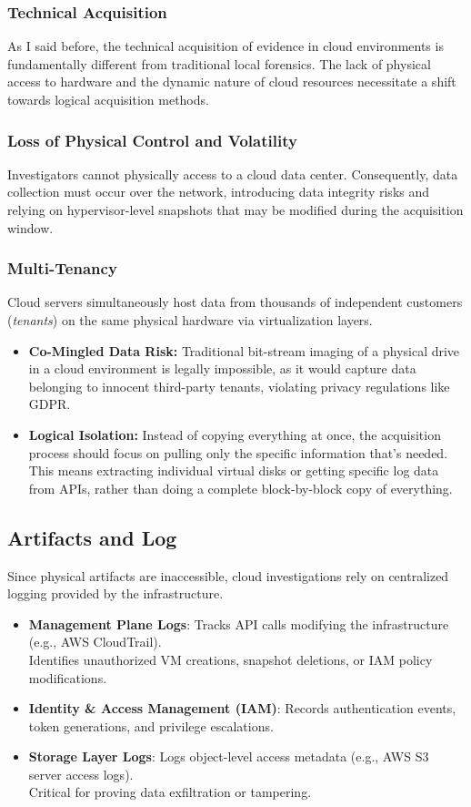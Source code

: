 \subsubsection{Technical Acquisition}
As I said before, the technical acquisition of evidence in cloud environments is fundamentally different from traditional local forensics. The lack of physical access to hardware and the dynamic nature of cloud resources necessitate a shift towards logical acquisition methods.

\subsubsection*{Loss of Physical Control and Volatility}
Investigators cannot physically access to a cloud data center. Consequently, data collection must occur over the network, introducing data integrity risks and relying on hypervisor-level snapshots that may be modified during the acquisition window.

\subsubsection*{Multi-Tenancy}
Cloud servers simultaneously host data from thousands of independent customers (\textit{tenants}) on the same physical hardware via virtualization layers.
\begin{itemize}
    \item \textbf{Co-Mingled Data Risk:} Traditional bit-stream imaging of a physical drive in a cloud environment is legally impossible, as it would capture data belonging to innocent third-party tenants, violating privacy regulations like GDPR.
    \item \textbf{Logical Isolation:} Instead of copying everything at once, the acquisition process should focus on pulling only the specific information that's needed. This means extracting individual virtual disks or getting specific log data from APIs, rather than doing a complete block-by-block copy of everything.
\end{itemize}

\subsection{Artifacts and Log}
Since physical artifacts are inaccessible, cloud investigations rely on centralized logging provided by the infrastructure.

\begin{itemize}
    \item \textbf{Management Plane Logs}: Tracks API calls modifying the infrastructure (e.g., AWS CloudTrail).\\ Identifies unauthorized VM creations, snapshot deletions, or IAM policy modifications.
    \item \textbf{Identity \& Access Management (IAM)}: Records authentication events, token generations, and privilege escalations. 
    \item \textbf{Storage Layer Logs}: Logs object-level access metadata (e.g., AWS S3 server access logs).\\ Critical for proving data exfiltration or tampering.
\end{itemize}

